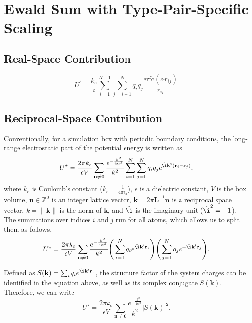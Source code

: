 \documentclass[11pt]{article}
\newcommand{\vt}[1]{\boldsymbol{\mathbf{#1}}}           %
\newcommand{\tr}[1]{#1^\text{t}}                        %
\newcommand{\im}{\hat{\i}}                              %
\begin{document}
\section{Ewald Sum with Type-Pair-Specific Scaling}

\subsection{Real-Space Contribution}

\begin{equation*}
U^\prime = \frac{k_e}{\epsilon} \sum_{i=1}^{N-1} \sum_{j=i+1}^N q_i q_j \frac{\text{erfc}(\alpha r_{ij})}{r_{ij}}
\end{equation*}

\subsection{Reciprocal-Space Contribution}

Conventionally, for a simulation box with periodic boundary conditions, the long-range electrostatic part of the potential energy is written as
\begin{equation*}
U^\star = \frac{2\pi k_e}{\epsilon V} \sum_{\vt n \neq \vt 0} \frac{e^{-\frac{k^2}{4\alpha^2}}}{k^2} \sum_{i=1}^N \sum_{j=1}^N q_i q_j e^{\im \tr{\vt k}({\vt r}_i - {\vt r}_j)},
\end{equation*}
where $k_e$ is Coulomb's constant ($k_e = \frac{1}{4\pi\epsilon_0}$), $\epsilon$ is a dielectric constant, $V$ is the box volume, $\vt n \in \mathbb Z^3$ is an integer lattice vector, $\vt k = 2\pi \vt L^{-1}{\vt n}$ is a reciprocal space vector, $k = \|\vt k\|$ is the norm of $\vt k$, and $\im$ is the imaginary unit ($\im^2 = -1$). The summations over indices $i$ and $j$ run for all atoms, which allows us to split them as follows,
\begin{equation*}
U^\star = \frac{2\pi k_e}{\epsilon V}\sum_{\vt n \neq \vt 0} \frac{e^{-\frac{k^2}{4\alpha^2}}}{k^2} \Bigg(\sum_{i=1}^N q_i e^{\im \tr{\vt k}{\vt r}_i} \Bigg) \Bigg(\sum_{j=1}^N q_j e^{-\im \tr{\vt k}{\vt r}_j}\Bigg).
\end{equation*}

Defined as $S(\vt k) = \sum_i q_i e^{\im \tr{\vt k}{\vt r}_i}$, the structure factor of the system charges can be identified in the equation above, as well as its complex conjugate ${\overline S}(\vt k)$. Therefore, we can write
\begin{equation*}
U^\star = \frac{2\pi k_e}{\epsilon V}\sum_{\vt n \neq \vt 0} \frac{e^{-\frac{k^2}{4\alpha^2}}}{k^2} |S(\vt k)|^2.
\end{equation*}
\end{document}
